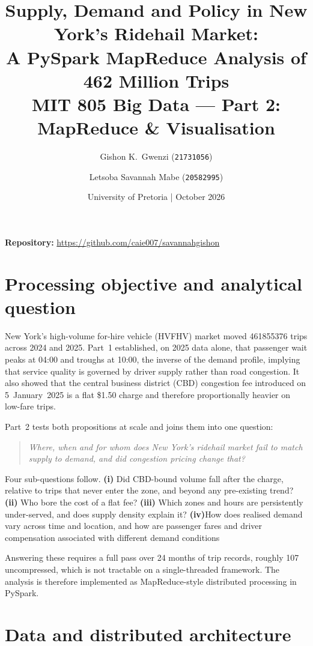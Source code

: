 \documentclass[10pt,a4paper]{article}
\title{\vspace{-2.6em}\textbf{Supply, Demand and Policy in New York's Ridehail Market:\\
A PySpark MapReduce Analysis of 462 Million Trips}\\[0.2em]
\normalsize MIT 805 Big Data --- Part 2: MapReduce \& Visualisation}
\author{\normalsize Gishon K.\ Gwenzi (\texttt{21731056}) \and
        \normalsize Letsoba Savannah Mabe (\texttt{20582995})}
\date{\vspace{-1em}\small University of Pretoria \quad|\quad 8 October 2026}
\begin{document}
\maketitle
\vspace{-2.9em}
\begin{center}\footnotesize
\textbf{Repository:} \url{https://github.com/caie007/savannahgishon}
\end{center}
\vspace{-0.5em}

\section{Processing objective and analytical question}

New York's high-volume for-hire vehicle (HVFHV) market moved \num{461855376}
trips across 2024 and 2025. Part~1 established, on 2025 data alone, that
passenger wait peaks at 04:00 and troughs at 10:00, the inverse of the demand
profile, implying that service quality is governed by driver supply rather
than road congestion. It also showed that the central business district (CBD)
congestion fee introduced on 5~January~2025 is a flat \$1.50 charge and
therefore proportionally heavier on low-fare trips.

Part~2 tests both propositions at scale and joins them into one question:

\begin{quote}
\emph{Where, when and for whom does New York's ridehail market fail to match
supply to demand, and did congestion pricing change that?}
\end{quote}

Four sub-questions follow. \textbf{(i)} Did CBD-bound volume fall after the
charge, relative to trips that never enter the zone, and beyond any pre-existing
trend? \textbf{(ii)} Who bore the cost of a flat fee? \textbf{(iii)} Which zones
and hours are persistently under-served, and does supply density explain it? \textbf{(iv)}How does realised demand vary across time and location, and how
are passenger fares and driver compensation associated with different
demand conditions

Answering these requires a full pass over 24 months of trip records, roughly
\SI{107}{\giga\byte} uncompressed, which is not tractable on a single-threaded
framework. The analysis is therefore implemented as MapReduce-style distributed
processing in PySpark.

\section{Data and distributed architecture}
\end{document}
